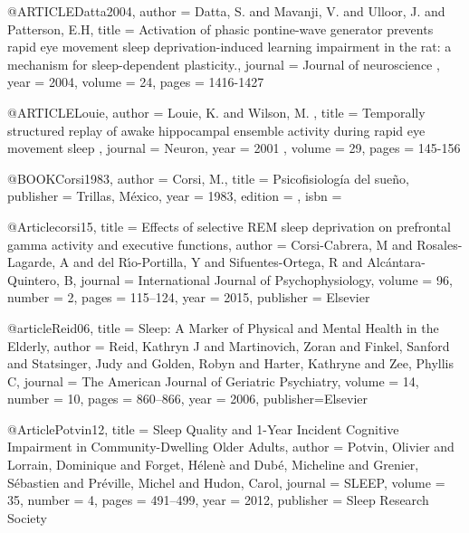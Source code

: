 @ARTICLE{Datta2004,
author = {Datta, S. and Mavanji, V. and Ulloor, J. and Patterson, E.H},
title = {Activation of phasic pontine-wave generator prevents rapid eye movement sleep deprivation-induced learning impairment in the rat: a mechanism for sleep-dependent plasticity.},
journal = {Journal of neuroscience },
year = {2004},
volume = {24},
pages = {1416-1427}
}

@ARTICLE{Louie,
author = {Louie, K. and Wilson, M.  },
title = {Temporally structured replay of awake hippocampal ensemble activity during rapid eye movement sleep },
journal = {Neuron},
year = {2001 },
volume = {29},
pages = {145-156 }
}

@BOOK{Corsi1983,
author = {Corsi, M.},
title = {Psicofisiolog\'ia del sueño},
publisher = {Trillas, México},
year = {1983},
edition = {},
isbn = {}
}

@Article{corsi15,
    title   = {Effects of selective {REM} sleep deprivation on prefrontal gamma activity and 
               executive functions},
    author  = {Corsi-Cabrera, M 
               and Rosales-Lagarde, A 
               and del R{\'\i}o-Portilla, Y 
               and Sifuentes-Ortega, R 
               and Alc{\'a}ntara-Quintero, B},
    journal = {{International Journal of Psychophysiology}},
    volume  = {96},
    number  = {2},
    pages   = {115--124},
    year    = {2015},
    publisher = {Elsevier}
}

@article{Reid06,
    title   = {Sleep: {A} {M}arker of {P}hysical and {M}ental {H}ealth in the {E}lderly},
    author  = {Reid, Kathryn J 
               and Martinovich, Zoran 
               and Finkel, Sanford 
               and Statsinger, Judy 
               and Golden, Robyn 
               and Harter, Kathryne 
               and Zee, Phyllis C},
    journal = {The {A}merican {J}ournal of {G}eriatric {P}sychiatry},
    volume  = {14},
    number  = {10},
    pages   = {860--866},
    year    = {2006},
    publisher={Elsevier}
}

@Article{Potvin12,
    title   = {Sleep {Q}uality and 1-{Y}ear {I}ncident {C}ognitive {I}mpairment in 
               {C}ommunity-{D}welling {O}lder {A}dults},
    author  = {Potvin, Olivier 
               and Lorrain, Dominique 
               and Forget, H{\'e}len{\`e} 
               and Dub{\'e}, Micheline 
               and Grenier, S{\'e}bastien 
               and Pr{\'e}ville, Michel 
               and Hudon, Carol},
    journal = {{SLEEP}},
    volume  = {35},
    number  = {4},
    pages   = {491--499},
    year    = {2012},
    publisher = {Sleep Research Society}
}

